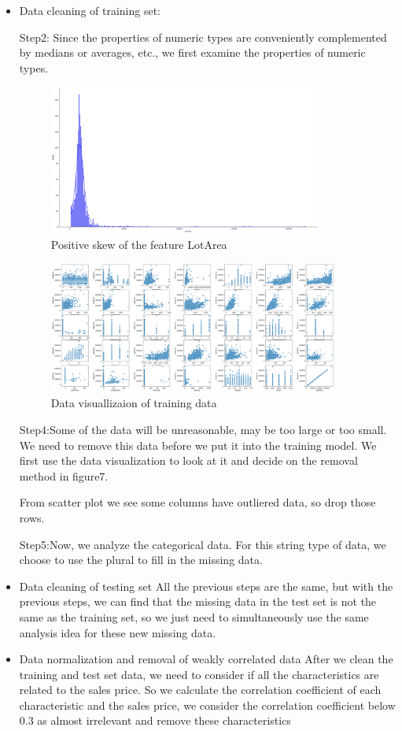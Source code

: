 \documentclass{amsart}
\begin{document}
\begin{itemize}
	\item Data cleaning of training set:\par
	Step2:	Since the properties of numeric types are conveniently complemented by medians or averages, etc., we first examine the properties of numeric types.\par
	\begin{figure}[H]
		\centering
		\includegraphics[width=0.85\textwidth]{../Data/Fig6}
		\caption{Positive skew of the feature LotArea}\label{object}
	\end{figure}
	\begin{figure}[H]
		\centering
		\includegraphics[width=0.9\textwidth]{../Data/Fig7}
		\caption{Data visuallizaion of training data}\label{object}
	\end{figure}
	Step4:Some of the data will be unreasonable, may be too large or too small. We need to remove this data before we put it into the training model. We first use the data visualization to look at it and decide on the removal method in figure7.\par
	From scatter plot we see some columns have outliered data, so drop those rows.\par
	Step5:Now, we analyze the categorical data. For this string type of data, we choose to use the plural to fill in the missing data.\par
	\item Data cleaning of testing set
	All the previous steps are the same, but with the previous steps, we can find that the missing data in the test set is not the same as the training set, so we just need to simultaneously use the same analysis idea for these new missing data.\par
	\item Data normalization and removal of weakly correlated data
	After we clean the training and test set data, we need to consider if all the characteristics are related to the sales price. So we calculate the correlation coefficient of each characteristic and the sales price, we consider the correlation coefficient below 0.3 as almost irrelevant and remove these characteristics
	\end{itemize}
\end{document}
